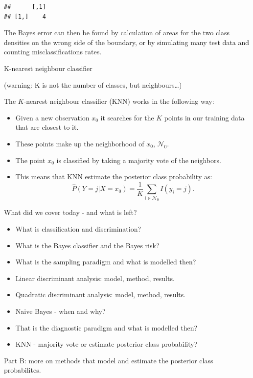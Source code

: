 \documentclass[10pt,ignorenonframetext,]{beamer}
\providecommand{\tightlist}{%
  \setlength{\itemsep}{0pt}\setlength{\parskip}{0pt}}
\begin{document}
\begin{frame}[fragile]
\begin{verbatim}
##      [,1]
## [1,]    4
\end{verbatim}

The Bayes error can then be found by calculation of areas for the two
class densities on the wrong side of the boundary, or by simulating many
test data and counting misclassifications rates.

\end{frame}

\begin{frame}{K-nearest neighbour classifier}

(warning: K is not the number of classes, but neighbours\ldots{})

The \(K\)-nearest neighbour classifier (KNN) works in the following way:

\begin{itemize}
\tightlist
\item
  Given a new observation \(x_0\) it searches for the \(K\) points in
  our training data that are closest to it.
\item
  These points make up the neighborhood of \(x_0\), \(\mathcal{N}_0\).
\item
  The point \(x_0\) is classified by taking a majority vote of the
  neighbors.
\item
  This means that KNN estimate the posterior class probability as:
  \[\hat{P}(Y=j | X = x_0) = \frac{1}{K} \sum_{i \in \mathcal{N}_0} I(y_i = j).\]
\end{itemize}

\end{frame}

\begin{frame}{What did we cover today - and what is left?}

\begin{itemize}
\tightlist
\item
  What is classification and discrimination?
\item
  What is the Bayes classifier and the Bayes risk?
\item
  What is the sampling paradigm and what is modelled then?
\item
  Linear discriminant analysis: model, method, results.
\item
  Quadratic discriminant analysis: model, method, results.
\item
  Naive Bayes - when and why?
\item
  That is the diagnostic paradigm and what is modelled then?
\item
  KNN - majority vote or estimate posterior class probability?
\end{itemize}

Part B: more on methods that model and estimate the posterior class
probabilites.

\end{frame}
\end{document}
